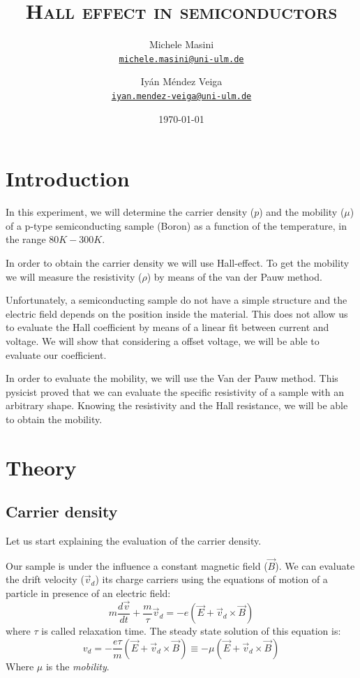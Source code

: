 \documentclass[11pt,a4paper]{article}
\title{\bfseries\textsc{Hall effect in semiconductors}}
\author{
Michele Masini\\ \small\texttt{\href{mailto:michele.masini@uni-ulm.de}{michele.masini@uni-ulm.de}}\and
Iyán Méndez Veiga\\ \small\texttt{\href{mailto:iyan.mendez-veiga@uni-ulm.de}{iyan.mendez-veiga@uni-ulm.de}}
}
\date{\today}
\begin{document}
\maketitle

\section{Introduction}
In this experiment, we will determine the carrier density ($p$) and the mobility ($\mu$) of a p-type semiconducting sample (Boron) as a function of the temperature, in the range $80K-300K$.

In order to obtain the carrier density we will use Hall-effect. To get the mobility we will measure the resistivity ($\rho$) by means of the van der Pauw method. 

Unfortunately, a semiconducting sample do not have a simple structure and the electric field depends on the position inside the material. This does not allow us to evaluate the Hall coefficient by means of a linear fit between current and voltage. We will show that considering a offset voltage, we will be able to evaluate our coefficient.

In order to evaluate the mobility, we will use the Van der Pauw method. This pysicist proved that we can evaluate the specific resistivity of a sample with an arbitrary shape. Knowing the resistivity and the Hall resistance, we will be able to obtain the mobility. 

\section{Theory}

\subsection{Carrier density}
Let us start explaining the evaluation of the carrier density.

Our sample is under the influence a constant magnetic field ($\vec{B}$). We can evaluate the drift velocity ($\vec{v}_d$) its charge carriers using the equations of motion of a particle in presence of an electric field:
\begin{equation*}
m\frac{d\vec{v}}{dt}+\frac{m}{\tau}\vec{v}_d=-e(\vec{E}+\vec{v}_d\times\vec{B})
\end{equation*} where $\tau$ is called relaxation time. The steady state solution of this equation is: 
\begin{equation}
v_d=-\frac{e\tau}{m}(\vec{E}+\vec{v}_d\times\vec{B})\equiv -\mu (\vec{E}+\vec{v}_d\times\vec{B})
\end{equation}Where $\mu$ is the \emph{mobility}. %
\end{document}
